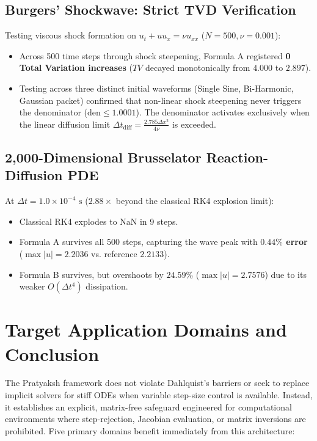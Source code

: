 \documentclass[11pt,a4paper]{article}
\theoremstyle{definition}
\begin{document}
\subsection{Burgers' Shockwave: Strict TVD Verification}
Testing viscous shock formation on $u_t + u u_x = \nu u_{xx}$ ($N = 500, \nu = 0.001$):
\begin{itemize}
    \item Across 500 time steps through shock steepening, Formula A registered \textbf{0 Total Variation increases} ($TV$ decayed monotonically from $4.000$ to $2.897$).
    \item Testing across three distinct initial waveforms (Single Sine, Bi-Harmonic, Gaussian packet) confirmed that non-linear shock steepening never triggers the denominator ($\text{den} \le 1.0001$). The denominator activates exclusively when the linear diffusion limit $\Delta t_{\text{diff}} = \frac{2.785 \Delta x^2}{4\nu}$ is exceeded.
\end{itemize}

\subsection{2,000-Dimensional Brusselator Reaction-Diffusion PDE}
At $\Delta t = 1.0 \times 10^{-4}\text{ s}$ ($2.88\times$ beyond the classical RK4 explosion limit):
\begin{itemize}
    \item Classical RK4 explodes to $\text{NaN}$ in 9 steps.
    \item Formula A survives all 500 steps, capturing the wave peak with \textbf{$0.44\%$ error} ($\max|u| = 2.2036$ vs. reference $2.2133$).
    \item Formula B survives, but overshoots by $24.59\%$ ($\max|u| = 2.7576$) due to its weaker $O(\Delta t^4)$ dissipation.
\end{itemize}


\section{Target Application Domains and Conclusion}

The Pratyaksh framework does not violate Dahlquist's barriers or seek to replace implicit solvers for stiff ODEs when variable step-size control is available. Instead, it establishes an explicit, matrix-free safeguard engineered for computational environments where step-rejection, Jacobian evaluation, or matrix inversions are prohibited. Five primary domains benefit immediately from this architecture:
\end{document}
